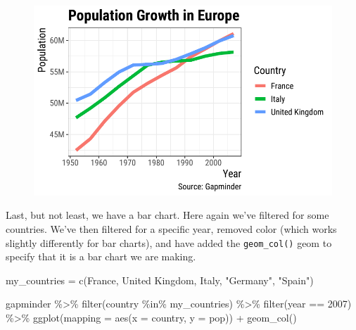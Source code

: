 \documentclass[
  letterpaper,
]{book}
\newenvironment{Shaded}{\begin{snugshade}}{\end{snugshade}}
\newcommand{\AttributeTok}[1]{\textcolor[rgb]{0.40,0.45,0.13}{#1}}
\newcommand{\DecValTok}[1]{\textcolor[rgb]{0.68,0.00,0.00}{#1}}
\newcommand{\FunctionTok}[1]{\textcolor[rgb]{0.28,0.35,0.67}{#1}}
\newcommand{\NormalTok}[1]{\textcolor[rgb]{0.00,0.23,0.31}{#1}}
\newcommand{\OtherTok}[1]{\textcolor[rgb]{0.00,0.23,0.31}{#1}}
\newcommand{\SpecialCharTok}[1]{\textcolor[rgb]{0.37,0.37,0.37}{#1}}
\newcommand{\StringTok}[1]{\textcolor[rgb]{0.13,0.47,0.30}{#1}}
\begin{document}
\begin{figure}[H]

{\centering \includegraphics{visualizing-with-ggplot_files/figure-pdf/unnamed-chunk-29-1.pdf}

}

\end{figure}

Last, but not least, we have a bar chart. Here again we've filtered for
some countries. We've then filtered for a specific year, removed color
(which works slightly differently for bar charts), and have added the
\texttt{geom\_col()} geom to specify that it is a bar chart we are
making.

\begin{Shaded}
\begin{Highlighting}[]
\NormalTok{my\_countries }\OtherTok{=} \FunctionTok{c}\NormalTok{(}\StringTok{\textquotesingle{}France\textquotesingle{}}\NormalTok{, }\StringTok{\textquotesingle{}United Kingdom\textquotesingle{}}\NormalTok{, }\StringTok{\textquotesingle{}Italy\textquotesingle{}}\NormalTok{, }\StringTok{"Germany"}\NormalTok{, }\StringTok{"Spain"}\NormalTok{)}

\NormalTok{gapminder }\SpecialCharTok{\%\textgreater{}\%}
  \FunctionTok{filter}\NormalTok{(country }\SpecialCharTok{\%in\%}\NormalTok{ my\_countries) }\SpecialCharTok{\%\textgreater{}\%}
  \FunctionTok{filter}\NormalTok{(year }\SpecialCharTok{==} \DecValTok{2007}\NormalTok{) }\SpecialCharTok{\%\textgreater{}\%}
  \FunctionTok{ggplot}\NormalTok{(}\AttributeTok{mapping =} \FunctionTok{aes}\NormalTok{(}\AttributeTok{x =}\NormalTok{ country, }
                       \AttributeTok{y =}\NormalTok{ pop)) }\SpecialCharTok{+}  
  \FunctionTok{geom\_col}\NormalTok{()}
\end{Highlighting}
\end{Shaded}
\end{document}
